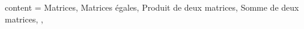 {
  content = {
    Matrices,
    Matrices égales,
    Produit de deux matrices,
    Somme de deux matrices,
  },
}
\endinput
